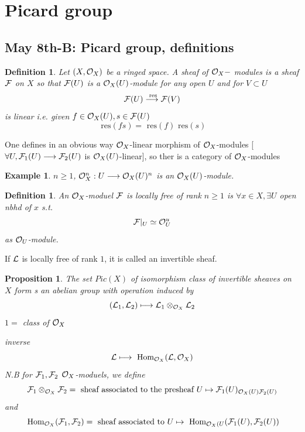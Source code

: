 \documentclass[11pt]{article}
\newtheorem{prop}[thm]{Proposition}
\newtheorem{dfn}[thm]{Definition}
\newtheorem{ex}[thm]{Example}
\renewcommand{\hom}{\text{ Hom}}
\newcommand{\res}{\text{ res}}
\newcommand{\calf}{{\cal F}}
\newcommand{\call}{{\cal L}}
\newcommand{\calo}{{\cal O}}
\newcommand{\lrta}{\longrightarrow}
\begin{document}
\section{Picard group}
\subsection{May 8th-B: Picard group, definitions}
\begin{dfn}
Let $(X,\calo_X)$ be a ringed space. A sheaf of $\calo_X-$ modules is a sheaf
$\calf$ on $X$ so that $\calf(U)$ is a $\calo_X(U)$-module for any open $U$ and for $V\subset U$
$$
\calf(U)\overset{\res}{\lrta}\calf(V)
$$
is linear i.e. given $f\in \calo_X(U), s\in \calf(U)$
$$
\res (f s)=\res(f)\res(s)
$$
\end{dfn}

One defines in an obvious way $\calo_X$-linear morphism of $\calo_X$-modules
[$\forall U, \calf_1(U)\lrta\calf_2(U)$ is $\calo_X(U)$-linear], so ther is a category of $\calo_X$-modules
\begin{ex}
$n\geq 1$, $\calo_X^n:U\lrta \calo_X(U)^n$ is an $\calo_X(U)$-module. 
\end{ex}
\begin{dfn}
An $\calo_X$-moduel $\calf$ is locally free of rank $n\geq 1$ is $\forall x\in X,\exists U $ open nbhd of $x $ s.t.
$$
\calf|_U\simeq \calo_U^u
$$
as $\calo_U$-module.
\end{dfn}

If $\call$ is  locally free of rank $1$, it is called an invertible sheaf.
\begin{prop}
The set $Pic(X)$ of isomorphism class of invertible sheaves on $X$ form s an abelian group with operation induced by 
$$
(\call_1,\call_2)\longmapsto \call_1\otimes_{\calo_X}\call_2
$$
$1=$ class of $\calo_X$

inverse
$$
\call\longmapsto \hom_{\calo_X}(\call,\calo_X)
$$
N.B for $\calf_1,\calf_2$ $\calo_X$-moduels, we define
$$
\calf_1\otimes_{\calo_X}\calf_2=\text{ sheaf associated to  the presheaf $U\mapsto \calf_1(U)_{\calo_X(U)\calf_2(U)}$}
$$
and
$$
\hom_{\calo_X}(\calf_1,\calf_2)=\text{ sheaf associated to $U\mapsto \hom_{\calo_X(U}(\calf_1(U),\calf_2(U))$}
$$
\end{prop}
\end{document}
